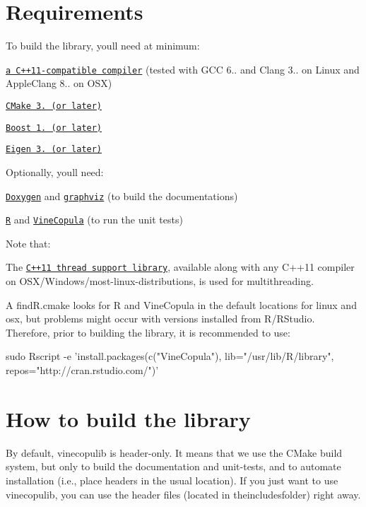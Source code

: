 \hypertarget{setup_Requirements}{}\section{Requirements}\label{setup_Requirements}
To build the library, you\textquotesingle{}ll need at minimum\+:


\begin{DoxyItemize}
\item \href{https://en.wikipedia.org/wiki/List_of_compilers#C.2B.2B_compilers}{\tt a C++11-\/compatible compiler} (tested with G\+CC 6.. and Clang 3.. on Linux and Apple\+Clang 8.. on O\+SX)
\item \href{https://cmake.org/}{\tt C\+Make 3. (or later)}
\item \href{http://www.boost.org/}{\tt Boost 1. (or later)}
\item \href{http://eigen.tuxfamily.org/index.php?title=Main_Page}{\tt Eigen 3. (or later)}
\end{DoxyItemize}

Optionally, you\textquotesingle{}ll need\+:
\begin{DoxyItemize}
\item \href{http://www.stack.nl/~dimitri/doxygen/}{\tt Doxygen} and \href{https://www.graphviz.org/}{\tt graphviz} (to build the documentations)
\item \href{https://www.r-project.org/about.html}{\tt R} and \href{https://github.com/tnagler/VineCopula}{\tt Vine\+Copula} (to run the unit tests)
\end{DoxyItemize}

Note that\+:


\begin{DoxyItemize}
\item The \href{http://en.cppreference.com/w/cpp/thread}{\tt C++11 thread support library}, available along with any C++11 compiler on O\+S\+X/\+Windows/most-\/linux-\/distributions, is used for multithreading.
\item A {\ttfamily find\+R.\+cmake} looks for R and Vine\+Copula in the default locations for linux and osx, but problems might occur with versions installed from R/\+R\+Studio. Therefore, prior to building the library, it is recommended to use\+: 
\begin{DoxyCode}
sudo Rscript -e \textcolor{stringliteral}{'install.packages(c("VineCopula"), lib="/usr/lib/R/library",}
\textcolor{stringliteral}{repos="http://cran.rstudio.com/")'}
\end{DoxyCode}

\end{DoxyItemize}\hypertarget{setup_build-lib}{}\section{How to build the library}\label{setup_build-lib}
By default, vinecopulib is header-\/only. It means that we use the C\+Make build system, but only to build the documentation and unit-\/tests, and to automate installation (i.\+e., place headers in the usual location). If you just want to use vinecopulib, you can use the header files (located in the{\ttfamily includes}folder) right away.

